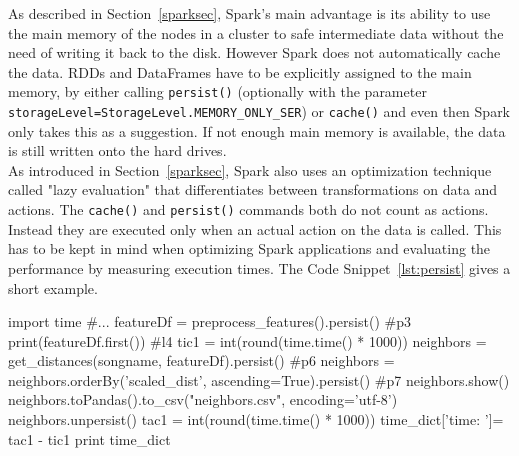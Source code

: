 As described in Section~\ref{sparksec}, Spark's main advantage is its ability to use the main memory of the nodes in a cluster to safe intermediate data without the need of writing it back to the disk. However Spark does not automatically cache the data. RDDs and DataFrames have to be explicitly assigned to the main memory, by either calling \lstinline{persist()} (optionally with the parameter \lstinline{storageLevel=StorageLevel.MEMORY_ONLY_SER}) or \lstinline{cache()} and even then Spark only takes this as a suggestion. If not enough main memory is available, the data is still written onto the hard drives.\\ As introduced in Section~\ref{sparksec}, Spark also uses an optimization technique called "lazy evaluation" that differentiates between transformations on data and actions. The \lstinline{cache()} and \lstinline{persist()} commands both do not count as actions. Instead they are executed only when an actual action on the data is called. This has to be kept in mind when optimizing Spark applications and evaluating the performance by measuring execution times. The Code Snippet~\ref{lst:persist} gives a short example. 

\begin{pythonCode}[frame=single,label={lst:persist},caption={Spark lazy evaluation},captionpos=b]
import time
#...
featureDf = preprocess_features().persist()	#p3
print(featureDf.first()) #l4
tic1 = int(round(time.time() * 1000))
neighbors = get_distances(songname, featureDf).persist() #p6
neighbors = neighbors.orderBy('scaled_dist', ascending=True).persist() #p7
neighbors.show()
neighbors.toPandas().to_csv("neighbors.csv", encoding='utf-8')
neighbors.unpersist()
tac1 = int(round(time.time() * 1000))
time_dict['time: ']= tac1 - tic1
print time_dict
\end{pythonCode}

